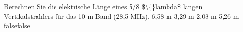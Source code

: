    {Berechnen Sie die elektrische Länge eines 5/8 \$\textbackslash\{\}lambda\$ langen Vertikalstrahlers für das 10 m-Band (28,5 MHz).}
    {6,58 m}
    {3,29 m}
    {2,08 m}
    {5,26 m}
    {false}{false}